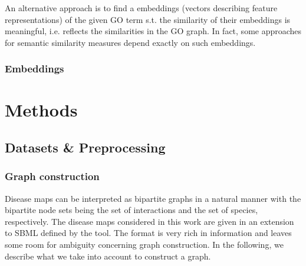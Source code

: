 \documentclass[
	fontsize=10pt, %
	twoside=false, %
	secnumdepth=1, %
  toc=indentunnumbered %
]{kaobook}
\begin{document}
An alternative approach is to find a embeddings (vectors describing feature
representations) of the given GO term s.t. the similarity of their embeddings is
meaningful, i.e. reflects the similarities in the GO graph. In fact, some
approaches for semantic similarity measures depend exactly on such embeddings.

\subsection{Embeddings}









\chapter{Methods}
\label{sec:methods}


\section{Datasets \& Preprocessing}
\label{sec:datasets}


\subsection{Graph construction}
\label{sec:graph-interpretation}
Disease maps can be interpreted as bipartite graphs in a natural manner with the
bipartite node sets being the set of interactions and the set of species,
respectively. The disease maps considered in this work are given in an extension
to SBML defined by the  tool. The format is very rich in
information and leaves some room for ambiguity concerning graph construction. In
the following, we describe what we take into account to construct a graph.
\end{document}
